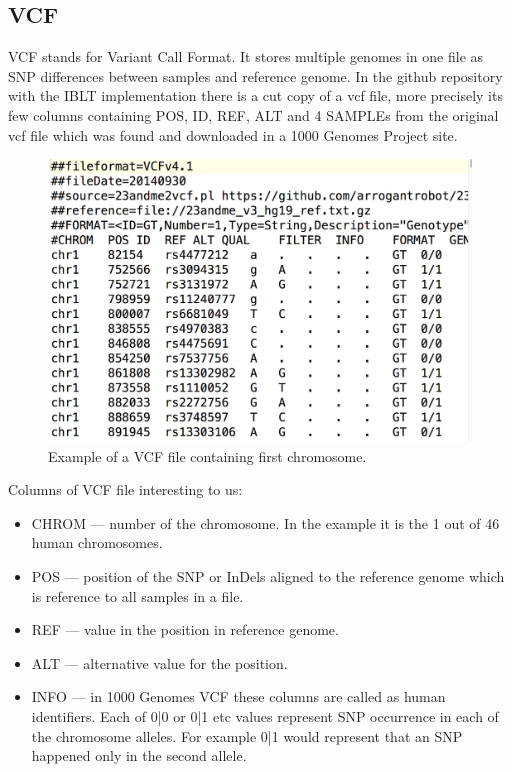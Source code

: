\documentclass{article}
\begin{document}
\subsection{VCF}
VCF stands for Variant Call Format. It stores multiple genomes in one file as 
SNP differences between samples and reference genome. 
In the github repository with the IBLT implementation there is a cut copy of a
vcf file, more precisely its few columns containing POS, ID, REF, ALT and 4 SAMPLEs 
from the original vcf file which was found and downloaded in a 1000 Genomes 
Project \textcite{genomes} site.
\begin{figure}[h]
\centering
\includegraphics[scale=0.25]{./vcf_format.jpg}
\caption{Example of a VCF file containing first chromosome.
}
\end{figure}
Columns of VCF file interesting to us:
\begin{itemize}
    \item CHROM --- number of the chromosome. In the example it is the 1 out
        of 46 human chromosomes.
    \item POS --- position of the SNP or InDels aligned to the reference genome
        which is reference to all samples in a file.
    \item REF --- value in the position in reference genome.
    \item ALT --- alternative value for the position.
    \item INFO --- in 1000 Genomes VCF these columns are called as human 
        identifiers. Each of 0|0 or 0|1 etc values represent SNP occurrence in 
        each of the chromosome alleles. For example 0|1 would represent that 
        an SNP happened only in the second allele.   
\end{itemize}
\end{document}
